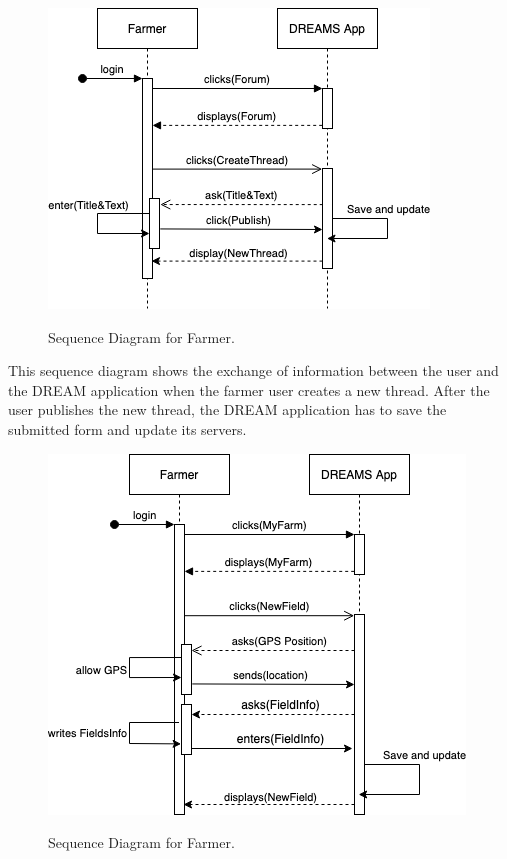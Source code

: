 \begin{figure}[hbt!]
\centering
\includegraphics[scale=0.6]{Files/sequence_disgrams/thePNGs/farmer_createThread.png}\\
\caption{\label{tab:farmerSeqNewThread}Sequence Diagram for Farmer.}
\end{figure}

\begin{flushleft}
This sequence diagram shows the exchange of information between the user and the DREAM application when the farmer user creates a new thread. After the user publishes the new thread, the DREAM application has to save the submitted form and update its servers.
\end{flushleft}


\begin{figure}[hbt!]
\centering
\includegraphics[scale=0.6]{Files/sequence_disgrams/thePNGs/farmer_newField.png}\\
\caption{\label{tab:farmerSeqNewField}Sequence Diagram for Farmer.}
\end{figure}

